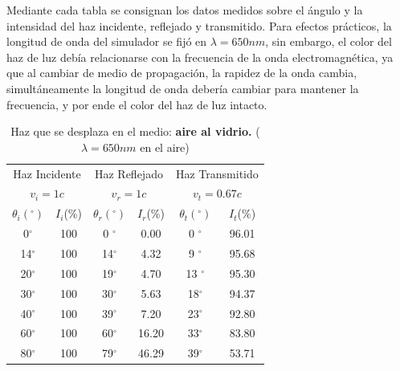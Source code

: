 \documentclass[
aps,
reprint,
amsmath, amssymb,
superscriptaddress,
]{revtex4-2}
\begin{document}
Mediante cada tabla se consignan los datos medidos sobre el ángulo y la intensidad del haz incidente, reflejado y transmitido. Para efectos prácticos, la longitud de onda del simulador se fijó en $\lambda=650nm$, sin embargo, el color del haz de luz debía relacionarse con la frecuencia de la onda electromagnética, ya que al cambiar de medio de propagación, la rapidez de la onda cambia, simultáneamente la longitud de onda debería cambiar para mantener la frecuencia, y por ende el color del haz de luz intacto.
\begin{table}[H]%
    \caption{\label{tab:tabla1}Haz que se desplaza en el medio: \textbf{aire al vidrio.} ($\lambda=650nm$ en el aire)}
     \begin{ruledtabular}
     \begin{tabular}{cc|cc|cc}
        \multicolumn{2}{c}{Haz Incidente}  & \multicolumn{2}{c}{Haz Reflejado} & \multicolumn{2}{c}{Haz Transmitido} \\
        \multicolumn{2}{c}{$v_i = 1c$}  & \multicolumn{2}{c}{$v_r=1c$} & \multicolumn{2}{c}{$v_t=0.67c$} \\
        \hline
        $\theta_i (^{\circ})$   & $I_{i}$(\%) & $\theta_r(^{\circ})$ & $I_{r}$(\%) & $\theta_t(^{\circ})$ & $I_{t}$(\%)\\
         0$^{\circ}$ & 100 & 0 $^{\circ}$ & 0.00  & 0 $^{\circ}$ & 96.01 \\
        14$^{\circ}$ & 100 & 14$^{\circ}$ & 4.32  & 9 $^{\circ}$ & 95.68 \\
        20$^{\circ}$ & 100 & 19$^{\circ}$ & 4.70  & 13 $^{\circ}$ & 95.30 \\
        30$^{\circ}$ & 100 & 30$^{\circ}$ & 5.63  & 18$^{\circ}$ & 94.37\\
        40$^{\circ}$ & 100 & 39$^{\circ}$ & 7.20  & 23$^{\circ}$ & 92.80\\
        60$^{\circ}$ & 100 & 60$^{\circ}$ & 16.20 & 33$^{\circ}$ & 83.80 \\
        80$^{\circ}$ & 100 & 79$^{\circ}$ & 46.29 & 39$^{\circ}$ & 53.71 \\
        \end{tabular}
     \end{ruledtabular}
\end{table}
\end{document}
